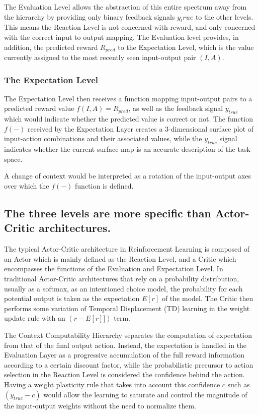 \documentclass[]{article}
\begin{document}
The Evaluation Level allows the abstraction of this entire spectrum away from the hierarchy by providing only binary feedback signals $y_true$ to the other levels.  This means the Reaction Level is not concerned with reward, and only concerned with the correct input to output mapping.  The Evaluation level provides, in addition, the predicted reward $R_{pred}$ to the Expectation Level, which is the value currently assigned to the most recently seen input-output pair $(I, A)$.

\subsubsection{The Expectation Level}
The Expectation Level then receives a function mapping input-output pairs to a predicted reward value $f(I, A) = R_{pred}$, as well as the feedback signal $y_{true}$ which would indicate whether the predicted value is correct or not.  The function $f(-)$ received by the Expectation Layer creates a 3-dimensional surface plot of input-action combinations and their associated values, while the $y_{true}$ signal indicates whether the current surface map is an accurate description of the task space.

A change of context would be interpreted as a rotation of the input-output axes over which the $f(-)$ function is defined. 

\subsection{The three levels are more specific than Actor-Critic architectures.}

The typical Actor-Critic architecture in Reinforcement Learning is composed of an Actor which is mainly defined as the Reaction Level, and a Critic which encompasses the functions of the Evaluation and Expectation Level.  In traditional Actor-Critic architectures that rely on a probability distribution, usually as a softmax, as an intentioned choice model, the probability for each potential output is taken as the expectation $E[r]$ of the model.  The Critic then performs some variation of Temporal Displacement (TD) learning in the weight update rule with an $(r - E[r]])$ term.  

The Context Computability Hierarchy separates the computation of expectation from that of the final output action.  Instead, the expectation is handled in the Evaluation Layer as a progressive accumulation of the full reward information according to a certain discount factor, while the probabilistic precursor to action selection in the Reaction Level is considered the confidence behind the action.  Having a weight plasticity rule that takes into account this confidence $c$ such as $(y_{true} - c)$ would allow the learning to saturate and control the magnitude of the input-output weights without the need to normalize them.
\end{document}
